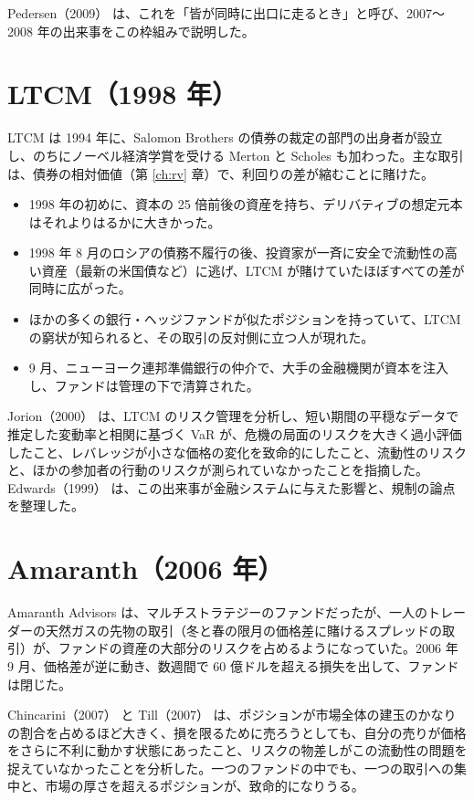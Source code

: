 Pedersen（2009）\cite{pedersen2009} は、これを「皆が同時に出口に走るとき」と呼び、2007〜2008 年の出来事をこの枠組みで説明した。

\section{LTCM（1998 年）}

LTCM は 1994 年に、Salomon Brothers の債券の裁定の部門の出身者が設立し、のちにノーベル経済学賞を受ける Merton と Scholes も加わった。主な取引は、債券の相対価値（第 \ref{ch:rv} 章）で、利回りの差が縮むことに賭けた。

\begin{itemize}
\item 1998 年の初めに、資本の 25 倍前後の資産を持ち、デリバティブの想定元本はそれよりはるかに大きかった。
\item 1998 年 8 月のロシアの債務不履行の後、投資家が一斉に安全で流動性の高い資産（最新の米国債など）に逃げ、LTCM が賭けていたほぼすべての差が同時に広がった。
\item ほかの多くの銀行・ヘッジファンドが似たポジションを持っていて、LTCM の窮状が知られると、その取引の反対側に立つ人が現れた。
\item 9 月、ニューヨーク連邦準備銀行の仲介で、大手の金融機関が資本を注入し、ファンドは管理の下で清算された。
\end{itemize}

Jorion（2000）\cite{jorion2000} は、LTCM のリスク管理を分析し、短い期間の平穏なデータで推定した変動率と相関に基づく VaR が、危機の局面のリスクを大きく過小評価したこと、レバレッジが小さな価格の変化を致命的にしたこと、流動性のリスクと、ほかの参加者の行動のリスクが測られていなかったことを指摘した。Edwards（1999）\cite{edwards1999} は、この出来事が金融システムに与えた影響と、規制の論点を整理した。

\section{Amaranth（2006 年）}

Amaranth Advisors は、マルチストラテジーのファンドだったが、一人のトレーダーの天然ガスの先物の取引（冬と春の限月の価格差に賭けるスプレッドの取引）が、ファンドの資産の大部分のリスクを占めるようになっていた。2006 年 9 月、価格差が逆に動き、数週間で 60 億ドルを超える損失を出して、ファンドは閉じた。

Chincarini（2007）\cite{chincarini2007} と Till（2007）\cite{till2007} は、ポジションが市場全体の建玉のかなりの割合を占めるほど大きく、損を限るために売ろうとしても、自分の売りが価格をさらに不利に動かす状態にあったこと、リスクの物差しがこの流動性の問題を捉えていなかったことを分析した。一つのファンドの中でも、一つの取引への集中と、市場の厚さを超えるポジションが、致命的になりうる。

